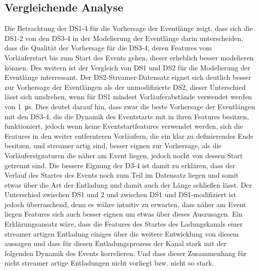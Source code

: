 \subsection{Vergleichende Analyse}
Die Betrachtung der DS1-4 für die Vorhersage der Eventlänge zeigt, dass sich die DS1-2 von den DS3-4 in der Modelierung der Eventlänge darin unterscheiden, dass die Qualität der Vorhersage für die DS3-4, deren Features vom Vorläuferstart bis zum Start des Events gehen, dieser erheblich besser modelieren können. Des weitern ist der Vergleich von DS1 und DS2 für die Modelierung der Eventlänge interressant. Der DS2-Streamer-Datensatz eignet sich deutlich besser zur Vorhersage der Eventlängen als der unmodifizierte DS2, dieser Unterschied lässt sich umdrehen, wenn für DS1 mindest Vorläuferabstände verwendet werden von \SI{1}{\micro\second}. Dies deutet darauf hin, dass zwar die beste Vorhersage der Eventlängen mit den DS3-4, die die Dynamik des Eventstarts mit in ihren Features besitzen, funktioniert, jedoch wenn keine Eventstartfeatures verwendet werden, sich die Features in den weiter entfernteren Vorläufern, die ein klar zu definierendes Ende besitzen, und streamer artig sind, besser eignen zur Vorhersage, als die Vorläufersignaturen die näher am Event liegen, jedoch nocht von dessen Start getrennt sind. Die bessere Eignung der D3-4 ist damit zu erklären, dass der Verlauf des Startes des Events noch zum Teil im Datensatz liegen und somit etwas über die Art der Entladung und damit auch der Länge schließen lässt. Der Unterschied zwischen DS1 und 2 und zwischen DS1 und DS1-modifiziert ist jedoch überraschend, denn es währe intuitiv zu erwarten, dass näher am Event liegen Features sich auch besser eignen um etwas über dieses Auszusagen. Ein Erklärungsansatz wäre, dass die Features des Startes des Ladungskanals einer streamer artigen Entladung einiges über die weitere Entwicklung von diesem aussagen und dass für diesen Entladungsprozess der Kanal stark mit der folgenden Dynamik des Events korrelieren. Und dass dieser Zusammenhang für nicht streamer artige Entladungen nicht vorliegt bzw. nicht so stark.


